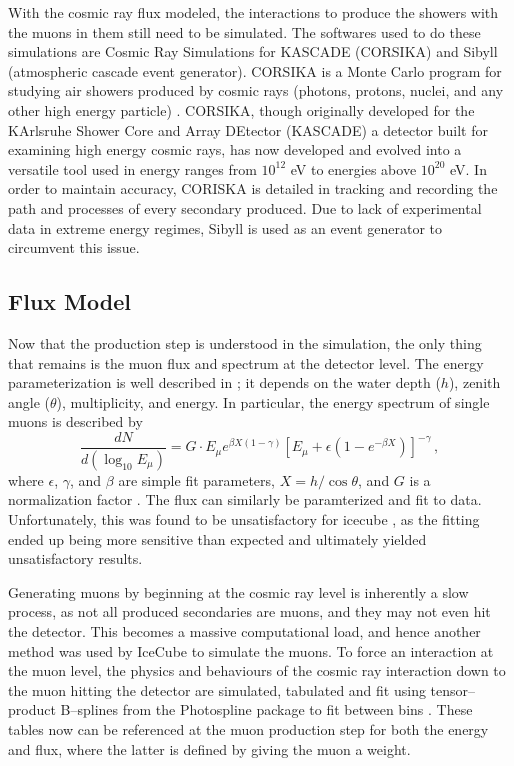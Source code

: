 With the cosmic ray flux modeled, the interactions to produce the showers with the muons in them still need to be simulated. The softwares used to do these simulations are Cosmic Ray Simulations for KASCADE (CORSIKA) and Sibyll (atmospheric cascade event generator). CORSIKA is a Monte Carlo program for studying air showers produced by cosmic rays (photons, protons, nuclei, and any other high energy particle) \cite{corsika}. CORSIKA, though originally developed for the KArlsruhe Shower Core and Array DEtector (KASCADE) \cite{kascade} a detector built for examining high energy cosmic rays, has now developed and evolved into a versatile tool used in energy ranges from $10^{12}$ eV to energies above $10^{20}$ eV. In order to maintain accuracy, CORISKA is detailed in tracking and recording the path and processes of every secondary produced. Due to lack of experimental data in extreme energy regimes, Sibyll is used as an event generator to circumvent this issue. 

\subsection{Flux Model}

Now that the production step is understood in the simulation, the only thing that remains is the muon flux and spectrum at the detector level. The energy parameterization is well described in \cite{muon_flux}; it depends on the water depth ($h$), zenith angle ($\theta$), multiplicity, and energy. In particular, the energy spectrum of single muons is described by
\begin{equation}
  \frac{dN}{d(\log_{10}E_{\mu})} = G\cdot E_{\mu}e^{\beta X(1 - \gamma)}\left[E_{\mu} + \epsilon(1 - e^{-\beta X})\right]^{-\gamma}\, ,
\end{equation}
where $\epsilon$, $\gamma$, and $\beta$ are simple fit parameters, $X=h/\cos\theta$, and $G$ is a normalization factor \cite{muon_flux}. The flux can similarly be paramterized and fit to data. Unfortunately, this was found to be unsatisfactory for icecube \cite{icetray}, as the fitting ended up being more sensitive than expected and ultimately yielded unsatisfactory results.

Generating muons by beginning at the cosmic ray level is inherently a slow process, as not all produced secondaries are muons, and they may not even hit the detector. This becomes a massive computational load, and hence another method was used by IceCube to simulate the muons. To force an interaction at the muon level, the physics and behaviours of the cosmic ray interaction down to the muon hitting the detector are simulated, tabulated and fit using tensor--product B--splines from the Photospline package to fit between bins \cite{icetray}. These tables now can be referenced at the muon production step for both the energy and flux, where the latter is defined by giving the muon a weight.

